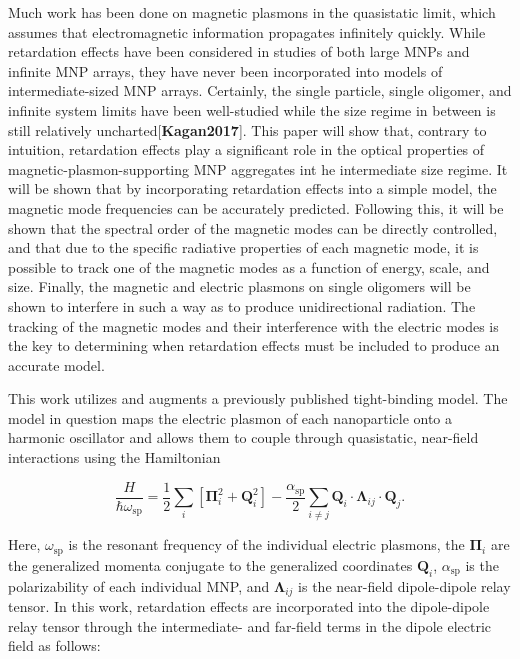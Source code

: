\documentclass[journal=apchd5,manuscript=article]{achemso}
\begin{document}
Much work has been done on magnetic plasmons in the quasistatic limit, which assumes that electromagnetic information propagates infinitely quickly. While retardation effects have been considered in studies of both large MNPs and infinite MNP arrays\cite{Abajo2008,Gu2010,vonPlessen2007,Rechbacher2003,Kottman2001,Schatz2003,Royer2005,Chumanov2010}, they have never been incorporated into models of intermediate-sized MNP arrays. Certainly, the single particle, single oligomer, and infinite system limits have been well-studied while the size regime in between is still relatively uncharted[\textbf{Kagan2017}]. This paper will show that, contrary to intuition, retardation effects play a significant role in the optical properties of magnetic-plasmon-supporting MNP aggregates int he intermediate size regime. It will be shown that by incorporating retardation effects into a simple model, the magnetic mode frequencies can be accurately predicted. Following this, it will be shown that the spectral order of the magnetic modes can be directly controlled, and that due to the specific radiative properties of each magnetic mode, it is possible to track one of the magnetic modes as a function of energy, scale, and size. Finally, the magnetic and electric plasmons on single oligomers will be shown to interfere in such a way as to produce unidirectional radiation. The tracking of the magnetic modes and their interference with the electric modes is the key to determining when retardation effects must be included to produce an accurate model.

This work utilizes and augments a previously published tight-binding model\cite{Cherqui2014}. The model in question maps the electric plasmon of each nanoparticle onto a harmonic oscillator and allows them to couple through quasistatic, near-field interactions using the Hamiltonian

\begin{equation}
\frac{H}{\hbar\omega_{\textrm{sp}}} = \frac{1}{2}\sum_{i}\left[\boldsymbol{\Pi}_{i}^2 + \textbf{Q}_{i}^{2}\right] - \frac{\alpha_{\textrm{sp}}}{2}\sum_{i\neq j}\textbf{Q}_{i}\cdot\boldsymbol{\Lambda}_{ij}\cdot\textbf{Q}_{j}.
\label{full_hammy}
\end{equation}

Here, $\omega_{\textrm{sp}}$ is the resonant frequency of the individual electric plasmons, the $\boldsymbol{\Pi}_{i}$ are the generalized momenta conjugate to the generalized coordinates $\textbf{Q}_{i}$, $\alpha_{\textrm{sp}}$ is the polarizability of each individual MNP, and $\boldsymbol{\Lambda}_{ij}$ is the near-field dipole-dipole relay tensor. In this work, retardation effects are incorporated into the dipole-dipole relay tensor through the intermediate- and far-field terms in the dipole electric field as follows:
\end{document}
